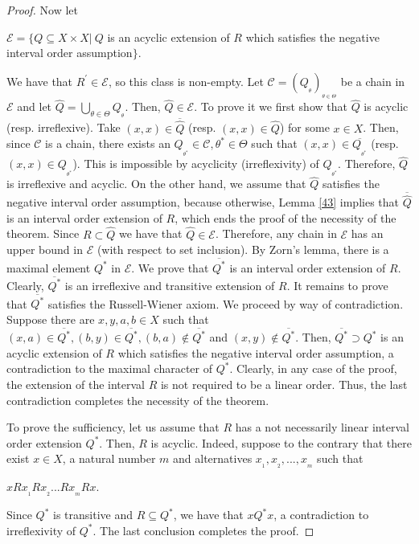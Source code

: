 \documentclass{article}
\theoremstyle{definition}
\begin{document}
\begin{proof}
Now let 
\begin{center}
$\mathcal{E}=\{Q\subseteq X\times X\vert\ Q$ 
is an acyclic extension of $R$ which satisfies the 
negative interval order assumption$\}$.
\end{center}
We have that
$R^{\prime}\in\mathcal{E}$, so this class is non-empty.
Let ${{\mathcal{C}}}=(Q_{_\theta})_{_{\theta\in \Theta}}$ be a chain in $\mathcal{E}$ and let
$\widehat{Q}=\displaystyle\bigcup_{\theta\in \Theta}Q_{_\theta}$. Then, $\widehat{Q}\in \mathcal{E}$.
To prove it we first show that $\widehat{Q}$ is acyclic (resp. irreflexive). Take $(x,x)\in\overline{\widehat{Q}}$ (resp. $(x,x)\in\widehat{Q}$)
for some $x\in X$.
Then, since ${{\mathcal{C}}}$ is a chain, there exists an $Q_{_{\theta^{\ast}}}\in {{\mathcal{C}}}, \theta^{\ast}\in \Theta$ such that $(x,x)\in\overline{Q_{_{\theta^{\ast}}}}$ (resp. $(x,x)\in Q_{_{\theta^{\ast}}}$). This is impossible by acyclicity (irreflexivity) of $Q_{_{\theta^{\ast}}}$. Therefore, $\widehat{Q}$ is irreflexive and acyclic.
On the other hand, we assume that $\widehat{Q}$
satisfies the 
negative interval order assumption, because otherwise, 
Lemma \ref{43} implies that $\overline{\widehat{Q}}$ is
an interval order extension of $R$, which ends the proof of the necessity of the theorem.
Since $R\subset \widehat{Q}$ we have that $\widehat{Q}\in \mathcal{E}$.
Therefore,
any chain 
in $\mathcal{E}$ has an upper bound in $\mathcal{E}$ (with respect to set inclusion).
By Zorn's lemma, there is a maximal element $Q^{\ast}$ in $\mathcal{E}$.
We prove that $\overline{Q^{\ast}}$ is an interval order extension of $R$. 
Clearly, $\overline{Q^{\ast}}$ is an irreflexive and transitive extension of $R$. It remains to prove that 
$\overline{Q^{\ast}}$
satisfies the Russell-Wiener axiom.
We proceed by way of contradiction. Suppose there are
$x, y, a, b\in X$ such that 
$(x,a)\in \overline{Q^{\ast}}, (b,y)\in \overline{Q^{\ast}}, (b,a)\notin \overline{Q^{\ast}}$
and $(x,y)\notin \overline{Q^{\ast}}$.
Then, $\overline{Q^{\ast}}\supset  Q^{\ast}$ is an acyclic extension of $R$ which satisfies
the negative interval order assumption, a contradiction to the maximal character of $Q^{\ast}$. Clearly, 
in any case of the proof, the extension of the interval $R$ is not required to be a linear order.
Thus,
the last contradiction completes the necessity of the theorem.



To prove the sufficiency, let us assume that $R$ has a
not necessarily linear interval
order extension 
$Q^{\ast}$.  Then, $R$ is acyclic. Indeed, suppose to the contrary that there exist 
$x\in X$, 
a natural number $m$ and alternatives $x_{_1}, x_{_2},...,x_{_m}$ such that 
\begin{center}
$xRx_{_1}Rx_{_2}...Rx_{_{m}}Rx$.
\end{center}
Since $Q^{\ast}$ is transitive and $R\subseteq Q^{\ast}$, we have that
$x Q^{\ast} x$, a contradiction to irreflexivity of $Q^{\ast}$. The last conclusion completes the proof. 
\end{proof}
\end{document}
